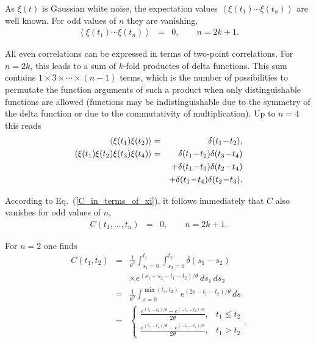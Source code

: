 \documentclass[aps,twocolumn,superscriptaddress,showpacs,showkeys]{revtex4}
\newcommand{\e}[1]{{ e^{#1/\theta} }}
\begin{document}
\noindent As $\xi(t)$ is Gaussian white noise, the expectation values $\left<\xi(t_1)\cdots\xi(t_n)\right>$ are
well known. For odd values of $n$ they are vanishing,
%
\begin{eqnarray}\label{C_odd_vanishes}
\left<\xi(t_1)\cdots\xi(t_n)\right> &=& 0,\qquad  n=2k+1.
\end{eqnarray}

\noindent All even correlations can be expressed in terms of two-point correlations. For $n=2k$, this
leads to a sum of $k$-fold productes of delta functions. This sum contains $1\times3\times\cdots\times(n\!-\!1)$
terms, which is the number of possibilities to permutate the function arguments of such a product when only
distinguishable functions are allowed (functions may be indistinguishable due to the symmetry of the delta function or
due to the commutativity of multiplication). Up to $n=4$ this reads
%
\begin{eqnarray}
\left<\xi(t_1)\xi(t_2)\right> &=& \delta(t_1\!-\!t_2),\\
\left<\xi(t_1)\xi(t_2)\xi(t_3)\xi(t_4)\right> &=& \delta(t_1\!-\!t_2)\delta(t_3\!-\!t_4)\cr&&
                                                 +\delta(t_1\!-\!t_3)\delta(t_2\!-\!t_4)\cr&&
                                                 +\delta(t_1\!-\!t_4)\delta(t_2\!-\!t_3).
\end{eqnarray}

\noindent According to Eq.~(\ref{C_in_terms_of_xi}), it follows immediately that $C$ also vanishes for odd values of $n$,
%
\begin{eqnarray}
C(t_1,\ldots,t_n) &=& 0,\qquad  n=2k+1.
\end{eqnarray}

\noindent For $n=2$ one finds
%
\begin{eqnarray}
\label{def_Ct1t2}
C(t_1,t_2) &=& \frac{1}{\theta^2}\int_{s_1=0}^{t_1}\int_{s_2=0}^{t_2}\delta(s_1\!-\!s_2) \nonumber\\[.3em]
           &&\times \e{(s_1+s_2-t_1-t_2)}\,ds_1\,ds_2 \nonumber\\[.3em]
           &=& \frac{1}{\theta^2}\int_{s=0}^{\min(t_1,t_2)}\e{(2s-t_1-t_2)}\,ds \nonumber\\[.3em]
           &=&
\left\{\begin{array}{ll}
  \frac{\e{(t_1-t_2)} - \e{(-t_1-t_2)}}{2\theta}  ,& t_1 \le   t_2\\[.3em]
  \frac{\e{(t_2-t_1)} - \e{(-t_2-t_1)}}{2\theta}  ,& t_1 > t_2 
\end{array}\right. .\label{twopoint_eta}
\end{eqnarray}
\end{document}
